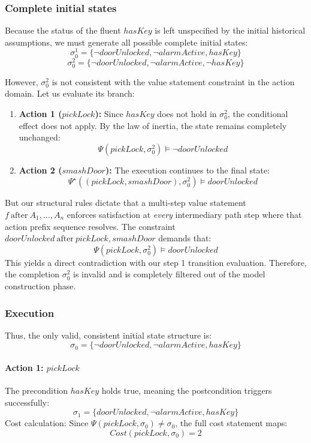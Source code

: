 \documentclass[11pt]{article}
\newcommand{\parr}{\par\vspace{5mm}\noindent}
\begin{document}
\subsubsection*{Complete initial states}
Because the status of the fluent $hasKey$ is left unspecified by the initial historical assumptions, we must generate all possible complete initial states:
\[
\sigma_0^1 = \{\neg doorUnlocked, \neg alarmActive, hasKey\}
\]
\[
\sigma_0^2 = \{\neg doorUnlocked, \neg alarmActive, \neg hasKey\}
\]

\parr
However, $\sigma_0^2$ is not consistent with the value statement constraint in the action domain.
Let us evaluate its branch:
\begin{enumerate}
    \item \textbf{Action 1 ($pickLock$):} Since $hasKey$ does not hold in $\sigma_0^2$, the conditional effect does not apply. By the law of inertia, the state remains completely unchanged:
    \[ \Psi(pickLock, \sigma_0^2) \models \neg doorUnlocked \]
    \item \textbf{Action 2 ($smashDoor$):} The execution continues to the final state:
    \[ \Psi^\star((pickLock, smashDoor), \sigma_0^2) \models doorUnlocked \]
\end{enumerate}
But our structural rules dictate that a multi-step value statement $f ~\text{after}~ A_1, \ldots, A_n$ enforces satisfaction at \emph{every} intermediary path step where that action prefix sequence resolves. The constraint $doorUnlocked ~\text{after}~ pickLock, smashDoor$ demands that:
\[ \Psi(pickLock, \sigma_0^2) \models doorUnlocked \]
This yields a direct contradiction with our step 1 transition evaluation. Therefore, the completion $\sigma_0^2$ is invalid and is completely filtered out of the model construction phase.

\subsubsection*{Execution}
Thus, the only valid, consistent initial state structure is:
\[
\sigma_0 = \{\neg doorUnlocked, \neg alarmActive, hasKey\}
\]

\paragraph{Action 1: $pickLock$}
The precondition $hasKey$ holds true, meaning the postcondition triggers successfully:
\[
\sigma_1 = \{doorUnlocked, \neg alarmActive, hasKey\}
\]
Cost calculation: Since $\Psi(pickLock, \sigma_0) \neq \sigma_0$, the full cost statement maps:
\[
Cost(pickLock, \sigma_0) = 2
\]
\end{document}
